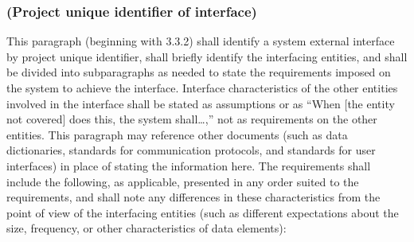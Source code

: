 \subsubsection{(Project unique identifier of interface)}

This paragraph (beginning with 3.3.2) shall identify a system external
interface by project unique identifier, shall briefly identify the
interfacing entities, and shall be divided into subparagraphs as needed
to state the requirements imposed on the system to achieve the
interface. Interface characteristics of the other entities involved in
the interface shall be stated as assumptions or as ``When {[}the entity
not covered{]} does this, the system shall\ldots{},'' not as
requirements on the other entities. This paragraph may reference other
documents (such as data dictionaries, standards for communication
protocols, and standards for user interfaces) in place of stating the
information here. The requirements shall include the following, as
applicable, presented in any order suited to the requirements, and shall
note any differences in these characteristics from the point of view of
the interfacing entities (such as different expectations about the size,
frequency, or other characteristics of data elements):

